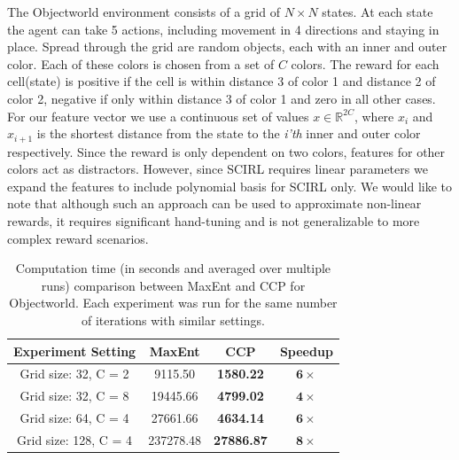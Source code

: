 \documentclass{article}
\begin{document}
The Objectworld environment consists of a grid of $N \times N$ states. At each state the agent can take 5 actions, including movement in 4 directions and staying in place. Spread through the grid are random objects, each with an inner and outer color. Each of these colors is chosen from a set of $C$ colors. The reward for each cell(state) is positive if the cell is within distance 3 of color 1 and distance 2 of color 2, negative if only within distance 3 of color 1 and zero in all other cases. For our feature vector we use a continuous set of values $x \in \mathbb{R}^{2C}$, where $x_i$ and $x_{i+1}$ is the shortest distance from the state to the \emph{i'th} inner and outer color respectively. Since the reward is only dependent on two colors, features for other colors act as distractors. However, since SCIRL requires linear parameters we expand the features to include polynomial basis for SCIRL only. We would like to note that although such an approach can be used to approximate non-linear rewards, it requires significant hand-tuning and is not generalizable to more complex reward scenarios. 

\begin{table}[t]
\centering
\def\arraystretch{1.2}%
\begin{tabular}{|c|c|c|c|}
\hline
Experiment Setting & MaxEnt & CCP & Speedup \\\hline

Grid size: 32, C = 2 & 9115.50 & \textbf{1580.22} & $\mathbf{6}\times$ \\
Grid size: 32, C = 8 & 19445.66 & \textbf{4799.02} & $\mathbf{4}\times$ \\
Grid size: 64, C = 4 & 27661.66 & \textbf{4634.14} & $\mathbf{6}\times$ \\
Grid size: 128, C = 4 & 237278.48 & \textbf{27886.87} & $\mathbf{8}\times$ \\
\hline
\end{tabular}
\caption{Computation time (in seconds and averaged over multiple runs) comparison between MaxEnt and CCP for Objectworld. Each experiment was run for the same number of iterations with similar settings. }
\label{table:table_results_objectworld}
\end{table}
\end{document}
